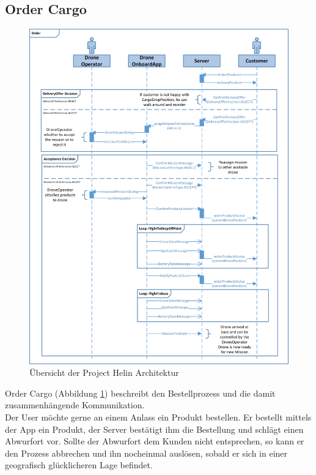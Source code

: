 \subsection{Order Cargo}
\begin{figure}[h]
	\centering
	\includegraphics[height=1.0\textheight]{images/sequence_diagram.png}
	\caption{Übersicht der Project Helin Architektur }
	\label{fig:registerDrone}
\end{figure}
%
Order Cargo (Abbildung \ref{fig:registerDrone}) beschreibt den Bestellprozess und die damit zusammenhängende Kommunikation. \\
Der User möchte gerne an einem Anlass ein Produkt bestellen. Er bestellt mittels der App ein Produkt, der Server bestätigt ihm die Bestellung und schlägt einen Abwurfort vor. Sollte der Abwurfort dem Kunden nicht entsprechen, so kann er den Prozess abbrechen und ihn nocheinmal auslösen, sobald er sich in einer geografisch glücklicheren Lage befindet.
\\
